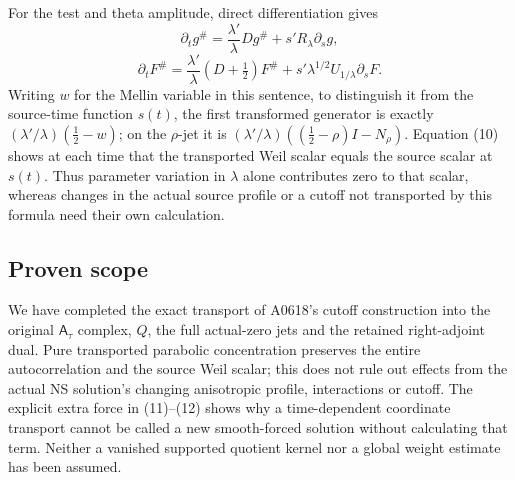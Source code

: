 For the test and theta amplitude, direct differentiation gives \[
\partial_tg^\#=\frac{\lambda'}{\lambda}Dg^\#+s'R_\lambda\partial_sg,
\] \[
\partial_tF^\#=\frac{\lambda'}{\lambda}(D+\tfrac12)F^\#+s'\lambda^{1/2}U_{1/\lambda}\partial_sF.
\tag{13}
\] Writing \(w\) for the Mellin variable in this sentence, to
distinguish it from the source-time function \(s(t)\), the first
transformed generator is exactly \((\lambda'/\lambda)(\tfrac12-w)\); on
the \(\rho\)-jet it is \((\lambda'/\lambda)((\tfrac12-\rho)I-N_\rho)\).
Equation (10) shows at each time that the transported Weil scalar equals
the source scalar at \(s(t)\). Thus parameter variation in \(\lambda\)
alone contributes zero to that scalar, whereas changes in the actual
source profile or a cutoff not transported by this formula need their
own calculation.

\subsection{Proven scope}\label{TranscriptStage:proof09:proven-scope}

We have completed the exact transport of A0618's cutoff construction
into the original \(\mathsf A_\tau\) complex, \(Q\), the full
actual-zero jets and the retained right-adjoint dual. Pure transported
parabolic concentration preserves the entire autocorrelation and the
source Weil scalar; this does not rule out effects from the actual NS
solution's changing anisotropic profile, interactions or cutoff. The
explicit extra force in (11)--(12) shows why a time-dependent coordinate
transport cannot be called a new smooth-forced solution without
calculating that term. Neither a vanished supported quotient kernel nor
a global weight estimate has been assumed.
